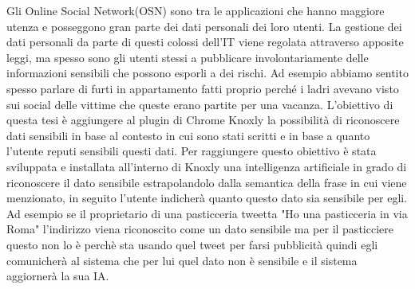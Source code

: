 Gli Online Social Network(OSN) sono tra le applicazioni che hanno maggiore utenza e posseggono gran parte dei dati personali dei loro utenti.\newline
La gestione dei dati personali da parte di questi colossi dell'IT viene regolata attraverso apposite leggi, ma spesso sono gli utenti stessi a pubblicare involontariamente delle informazioni sensibili che possono esporli a dei rischi. Ad esempio abbiamo sentito spesso parlare di furti in appartamento fatti proprio perché i ladri avevano visto sui social delle vittime che queste erano partite per una vacanza.\newline
L'obiettivo di questa tesi è aggiungere al plugin di Chrome Knoxly la possibilità di riconoscere dati sensibili in base al contesto in cui sono stati scritti e in base a quanto l'utente reputi sensibili questi dati. Per raggiungere questo obiettivo è stata sviluppata e installata all'interno di Knoxly una intelligenza artificiale in grado di riconoscere il dato sensibile estrapolandolo dalla semantica della frase in cui viene menzionato, in seguito l'utente indicherà quanto questo dato sia sensibile per egli. Ad esempio se il proprietario di una pasticceria tweetta "Ho una pasticceria in via Roma" l'indirizzo viena riconoscito come un dato sensibile ma per il pasticciere questo non lo è perchè sta usando quel tweet per farsi pubblicità quindi egli comunicherà al sistema che per lui quel dato non è sensibile e il sistema aggiornerà la sua IA.